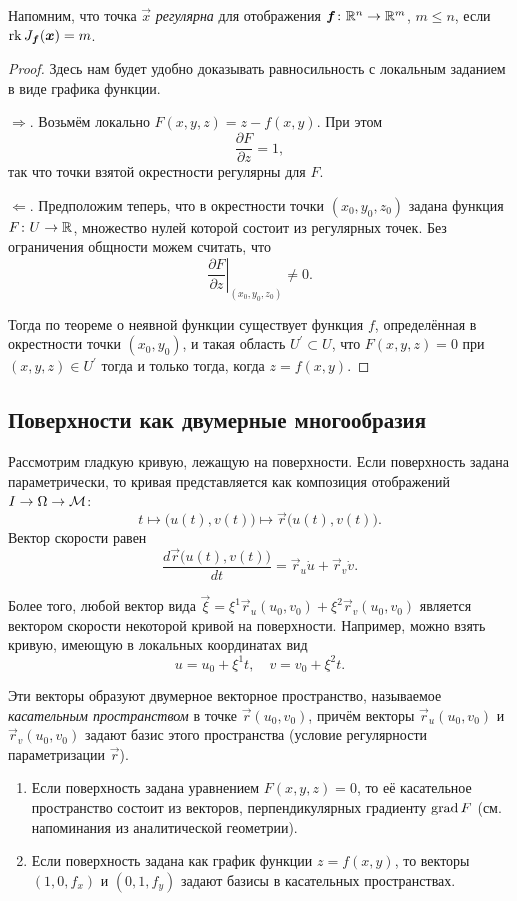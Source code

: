 \noindent
Напомним, что точка $\vec{x}$ \textit{регулярна} для отображения $\boldsymbol{f}\colon \mathbb{R}^n \to \mathbb{R}^m$, $m \leqslant n$, если $\operatorname{rk} J_{\boldsymbol{f}}(\boldsymbol{x}) = m$.

\begin{proof}
	Здесь нам будет удобно доказывать равносильность с локальным заданием в виде графика функции.

	$\Rightarrow$. Возьмём локально $F(x, y, z) = z - f(x, y)$. При этом
	\[
		\frac{\partial F}{\partial z} = 1,
	\]
	так что точки взятой окрестности регулярны для $F$.

	$\Leftarrow$. Предположим теперь, что в окрестности точки $(x_0, y_0, z_0)$ задана функция $F\colon U \to \mathbb{R}$, множество нулей которой состоит из регулярных точек. Без ограничения общности можем считать, что
	\[
		\left.\frac{\partial F}{\partial z}\right|_{(x_0, y_0, z_0)} \ne 0.
	\]

	Тогда по теореме о неявной функции существует функция $f$, определённая в окрестности точки $(x_0, y_0)$, и такая область $U^\prime \subset U$, что $F(x, y, z) = 0$ при $(x, y, z) \in U^\prime$ тогда и только тогда, когда $z = f(x, y)$.
\end{proof}

\subsection{Поверхности как двумерные многообразия}

Рассмотрим гладкую кривую, лежащую на поверхности. Если поверхность задана параметрически, то кривая представляется как композиция отображений $I \to \Omega \to \mathcal{M}$:
\[
	t \mapsto \big(u(t), v(t)\big) \mapsto \vec{r}\big(u(t), v(t)\big).
\]
Вектор скорости равен
\[
	\frac{d\vec{r}\big(u(t), v(t)\big)}{dt} = \vec{r}_u\dot{u} + \vec{r}_v\dot{v}.
\]

Более того, любой вектор вида $\vec{\xi} = \xi^1\vec{r}_u(u_0, v_0) + \xi^2\vec{r}_v(u_0, v_0)$ является вектором скорости некоторой кривой на поверхности. Например, можно взять кривую, имеющую в локальных координатах вид
\[
	u = u_0 + \xi^1t,\quad v = v_0 + \xi^2t.
\]

Эти векторы образуют двумерное векторное пространство, называемое \textit{касательным пространством} в точке $\vec{r}(u_0, v_0)$, причём векторы $\vec{r}_u(u_0, v_0)$ и $\vec{r}_v(u_0, v_0)$ задают базис этого пространства (условие регулярности параметризации $\vec{r}$).

\begin{example}
	\begin{enumerate}[nolistsep, label=(\arabic*)]
		\item Если поверхность задана уравнением $F(x, y, z) = 0$, то её касательное пространство состоит из векторов, перпендикулярных градиенту $\operatorname{grad} F$ (см. напоминания из аналитической геометрии).
		\item Если поверхность задана как график функции $z = f(x, y)$, то векторы $(1, 0, f_x)$ и $(0, 1, f_y)$ задают базисы в касательных пространствах.
	\end{enumerate}
\end{example}

